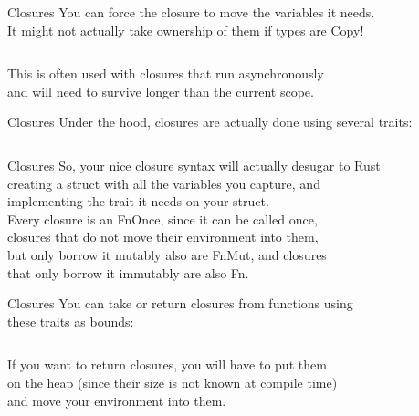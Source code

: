 \documentclass[usenames,dvipsnames,10pt,aspectratio=169]{beamer}
\begin{document}
\begin{frame}{Closures}
	\large
	You can force the closure to move the variables it needs.\\
	It might not actually take ownership of them if types are Copy!
	\vspace{0.5cm}
	\inputminted[fontsize=\Large]{rust}{code/closures6.rs}
	\vspace{0.5cm}
	This is often used with closures that run asynchronously\\
	and will need to survive longer than the current scope.
\end{frame}

\begin{frame}{Closures}
	\large
	Under the hood, closures are actually done using several traits:\\
	\vspace{0.5cm}
	\inputminted[fontsize=\large]{rust}{code/closures7.rs}
\end{frame}

\begin{frame}{Closures}
	\large
	So, your nice closure syntax will actually desugar to Rust\\
	creating a struct with all the variables you capture, and\\
	implementing the trait it needs on your struct.\\
	\vspace{0.5cm}
	Every closure is an \textcolor{ucuyellow}{FnOnce}, since it can be called once,\\
	closures that do not move their environment into them,\\
	but only borrow it mutably also are \textcolor{ucuyellow}{FnMut}, and closures\\
	that only borrow it immutably are also \textcolor{ucuyellow}{Fn}.\\
\end{frame}

\begin{frame}{Closures}
	\large
	You can take or return closures from functions using\\
	these traits as bounds:
	\vspace{0.3cm}
	\inputminted[fontsize=\large]{rust}{code/closures8.rs}
	\vspace{0.2cm}
	If you want to return closures, you will have to put them\\
	on the heap (since their size is not known at compile time)\\
	and move your environment into them.
	\vspace{0.2cm}
\end{frame}
\end{document}
